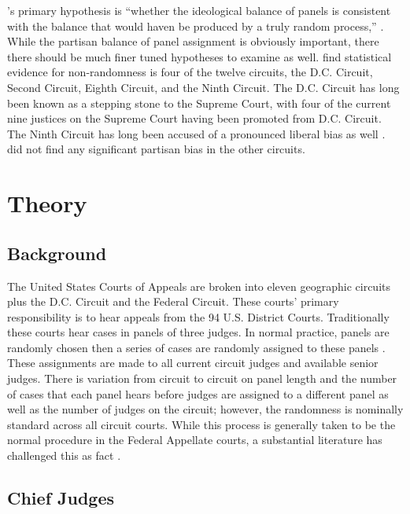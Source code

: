 \documentclass[12pt]{article}
\begin{document}
\citeauthor{Chilton2014}'s primary hypothesis is ``whether the ideological balance of panels is consistent with the balance that would haven be produced by a truly random process,'' \citep[20]{Chilton2014}.  While the partisan balance of panel assignment is obviously important, there there should be much finer tuned hypotheses to examine as well.  \citeauthor{Chilton2014} find statistical evidence for non-randomness is four of the twelve circuits, the D.C. Circuit, Second Circuit, Eighth Circuit, and the Ninth Circuit.  The D.C. Circuit has long been known as a stepping stone to the Supreme Court, with four of the current nine justices on the Supreme Court having been promoted from D.C. Circuit.  The Ninth Circuit has long been accused of a pronounced liberal bias as well \citep{farris1997ninth}.  \citeauthor{Chilton2014} did not find any significant partisan bias in the other circuits.

\section{Theory}\label{Theory}
\subsection*{Background}
The United States Courts of Appeals are broken into eleven geographic circuits plus the D.C. Circuit and the Federal Circuit. These courts' primary responsibility is to hear appeals from the 94 U.S. District Courts. Traditionally these courts hear cases in panels of three judges. In normal practice, panels are randomly chosen then a series of cases are randomly assigned to these panels \citep{Hooper2011,Journalist2011,Chilton2014,Songer2007}.  These assignments are made to all current circuit judges and available senior judges. There is variation from circuit to circuit on panel length and the number of cases that each panel hears before judges are assigned to a different panel as well as the number of judges on the circuit; however, the randomness is nominally standard across all circuit courts.  While this process is generally taken to be the normal procedure in the Federal Appellate courts, a substantial literature has challenged this as fact \citep{Atkins1974,Brown2000,Chilton2014}.  

\subsection*{Chief Judges}
\end{document}
